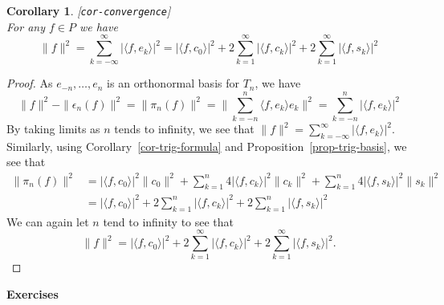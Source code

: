 \documentclass{amsart}
\newcommand{\lbl}[1]{\label{#1}\textup{[\texttt{#1}]}\ \\}
\newcommand{\lbl}{\label}
\newcommand{\ep}        {\epsilon}
\newcommand{\ip}[1]     {\langle #1\rangle}
\renewcommand{\:}       {\colon}
\newtheorem{corollary}[theorem]{Corollary}
\theoremstyle{definition}
\begin{document}
\begin{corollary}\lbl{cor-convergence}
 For any $f\in P$ we have
 \[ \|f\|^2 = \sum_{k=-\infty}^\infty |\ip{f,e_k}|^2 =
     |\ip{f,c_0}|^2 + 2 \sum_{k=1}^\infty |\ip{f,c_k}|^2 
                    + 2 \sum_{k=1}^\infty |\ip{f,s_k}|^2 
 \]
\end{corollary}
\begin{proof}
 As $e_{-n},\dotsc,e_n$ is an  orthonormal basis for $T_n$,
 we have
 \[
  \|f\|^2 - \|\ep_n(f)\|^2 = 
  \|\pi_n(f)\|^2
    = \|\sum_{k=-n}^n\ip{f,e_k}e_k\|^2 
    = \sum_{k=-n}^n |\ip{f,e_k}|^2
 \]
 By taking limits as $n$ tends to infinity, we see that
 $\|f\|^2 = \sum_{k=-\infty}^\infty |\ip{f,e_k}|^2$.
 Similarly, using Corollary~\ref{cor-trig-formula} and
 Proposition~\ref{prop-trig-basis}, we see that 
 \begin{align*}
  \|\pi_n(f)\|^2 &= 
     |\ip{f,c_0}|^2 \|c_0\|^2 + 
     \sum_{k=1}^n 4|\ip{f,c_k}|^2\|c_k\|^2 + 
     \sum_{k=1}^n 4|\ip{f,s_k}|^2\|s_k\|^2 \\
   &=  |\ip{f,c_0}|^2 +
       2\sum_{k=1}^n|\ip{f,c_k}|^2 +
       2\sum_{k=1}^n|\ip{f,s_k}|^2
 \end{align*}
 We can again let $n$ tend to infinity to see that 
 \[ \|f\|^2 = 
     |\ip{f,c_0}|^2 + 2\sum_{k=1}^\infty |\ip{f,c_k}|^2 
                    + 2\sum_{k=1}^\infty |\ip{f,s_k}|^2.
 \]
\end{proof}


\begin{center}
 \Large \textbf{Exercises}
\end{center}
\end{document}
